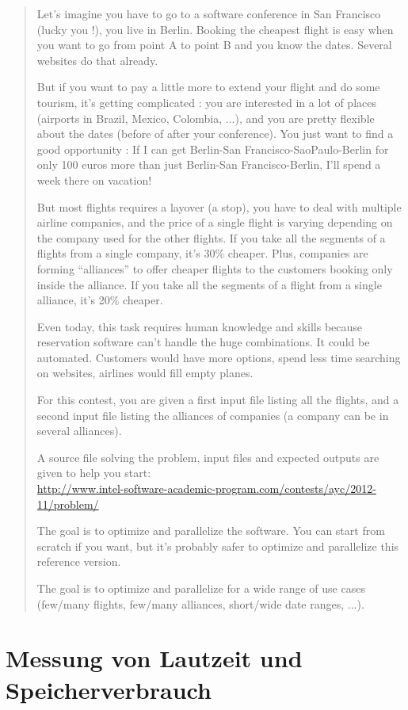 \documentclass[11pt]{scrartcl}
\begin{document}
\begin{quote}
Let’s imagine you have to go to a software conference in San Francisco (lucky you !), you live in Berlin. Booking the cheapest flight is easy when you want to go from point A to point B and you know the dates. Several websites do that already.

But if you want to pay a little more to extend your flight and do some tourism, it’s getting complicated : you are interested in a lot of places (airports in Brazil, Mexico, Colombia, ...), and you are pretty flexible about the dates (before of after your conference). You just want to find a good opportunity : If I can get Berlin-San Francisco-SaoPaulo-Berlin for only 100 euros more than just Berlin-San Francisco-Berlin, I’ll spend a week there on vacation!

But most flights requires a layover (a stop), you have to deal with multiple airline companies, and the price of a single flight is varying depending on the company used for the other flights. If you take all the segments of a flights from a single company, it’s 30\% cheaper. Plus, companies are forming “alliances” to offer cheaper flights to the customers booking only inside the alliance. If you take all the segments of a flight from a single alliance, it’s 20\% cheaper.

Even today, this task requires human knowledge and skills because reservation software can’t handle the huge combinations. It could be automated. Customers would have more options, spend less time searching on websites, airlines would fill empty planes.

For this contest, you are given a first input file listing all the flights, and a second input file listing the alliances of companies (a company can be in several alliances).

A source file solving the problem, input files and expected outputs are given to help you start:\\
\url{http://www.intel-software-academic-program.com/contests/ayc/2012-11/problem/}

The goal is to optimize and parallelize the software. You can start from scratch if you want, but it’s probably safer to optimize and parallelize this reference version.

The goal is to optimize and parallelize for a wide range of use cases (few/many flights, few/many alliances, short/wide date ranges, ...).
\end{quote}

\section{Messung von Lautzeit und Speicherverbrauch}
\end{document}
